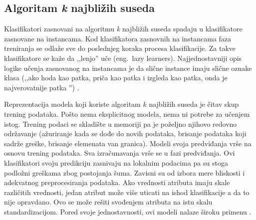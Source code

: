 \documentclass[12pt,oneside]{memoir}
\begin{document}
\subsection{Algoritam \textit{k} najbližih suseda}

Klasifikatori zasnovani na algoritmu \textit{k} najbližih suseda spadaju u klasifikatore zasnovane na instancama. Kod klasifikatora zasnovnih na instancama faza treniranja se odlaže sve do poslednjeg koraka procesa klasifikacije. Za takve klasifikatore se kaže da ,,lenjo'' uče (eng.~lazy learners). Najjednostavniji opis logike učenja zasnovanog na instancama je da slične instance imaju slične oznake klasa (,,ako hoda kao patka, priča kao patka i izgleda kao patka, onda je najverovatnije patka \cite{mitic}'') \cite{aggarwal}.

Reprezentacija modela koji koriste algoritam $k$ najbližih suseda je čitav skup trening podataka. Pošto nema eksplicitnog modela, nema ni potrebe za učenjem istog. Trening podaci se skladište u memoriji pa je poželjno njihovo redovno održavanje (ažuriranje kada se dođe do novih podataka, brisanje podataka koji sadrže greške, brisanje elemenata van granica). Modeli svoja predviđanja vrše na osnovu trening podataka. Sva izračunavanja vrše se u fazi predviđanja. Ovi klasifikatori svoju predikciju zasnivaju na lokalnim podacima pa su stoga podložni greškama zbog postojanja šuma. Zavisni su od izbora mere bliskosti i adekvatnog preprocesiranja podataka. Ako vrednosti atributa imaju skale različitih vrednosti, jedan atribut može više uticati na ishod klasifikacije a da to nije opravdano. Ovo se može rešiti svođenjem atributa na istu skalu standardizacijom. Pored svoje jednostavnosti, ovi modeli nalaze široku primenu \cite{mlm, mladen, mitic}.





\end{document}
